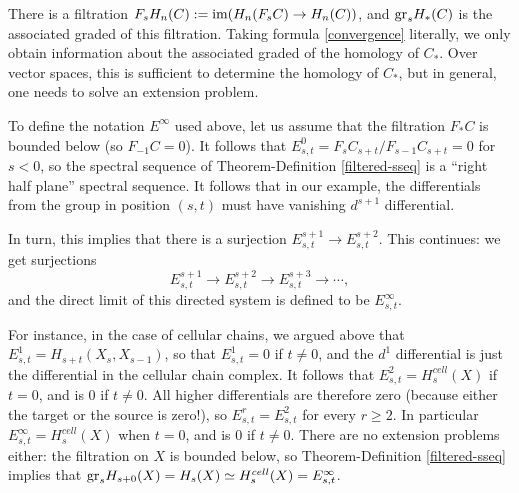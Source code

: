 There is a filtration $F_s H_n(C):=\operatorname{im}(H_n(F_s C) \to H_n(C))$, and $\mathrm{gr}_s
H_\ast(C)$ is the associated graded of this filtration. Taking formula
\eqref{convergence} literally, we only obtain information about the associated
graded of the homology of $C_\ast$. Over vector spaces, this is sufficient to
determine the homology of $C_\ast$, but in general, one needs to solve an
extension problem.

To define the notation $E^\infty$ used above, let us assume that the filtration
$F_\ast C$ is bounded below (so $F_{-1} C = 0$). It follows that $E^0_{s,t} =
F_s C_{s+t}/F_{s-1} C_{s+t} = 0$ for $s<0$, so the spectral sequence of
Theorem-Definition \ref{filtered-sseq} is a ``right half plane'' spectral
sequence. It follows that in our example, the differentials from the group in
position $(s,t)$ must have vanishing $d^{s+1}$ differential.

In turn, this implies that there is a surjection $E^{s+1}_{s,t} \to
E^{s+2}_{s,t}$. This continues: we get surjections
$$E^{s+1}_{s,t}\to E^{s+2}_{s,t}\to E^{s+3}_{s,t}\to\cdots,$$
and the direct limit of this directed system is defined to be $E^\infty_{s,t}$.

For instance, in the case of cellular chains, we argued above that $E^1_{s,t} =
H_{s+t}(X_s, X_{s-1})$, so that $E^1_{s,t} = 0$ if $t\neq 0$, and the $d^1$
differential is just the differential in the cellular chain complex. It follows
that $E^2_{s,t} = H_s^{cell}(X)$ if $t=0$, and is $0$ if $t\neq 0$. All higher
differentials are therefore zero (because either the target or the source is
zero!), so $E^r_{s,t} = E^2_{s,t}$ for every $r\geq 2$. In particular
$E^\infty_{s,t} = H_s^{cell}(X)$ when $t=0$, and is $0$ if $t\neq 0$. There are
no extension problems either: the filtration on $X$ is bounded below, so
Theorem-Definition \ref{filtered-sseq} implies that $\mathrm{gr}_s H_{s+0}(X) = H_s(X)
\simeq H_s^{cell}(X) = E^\infty_{s,t}$.

